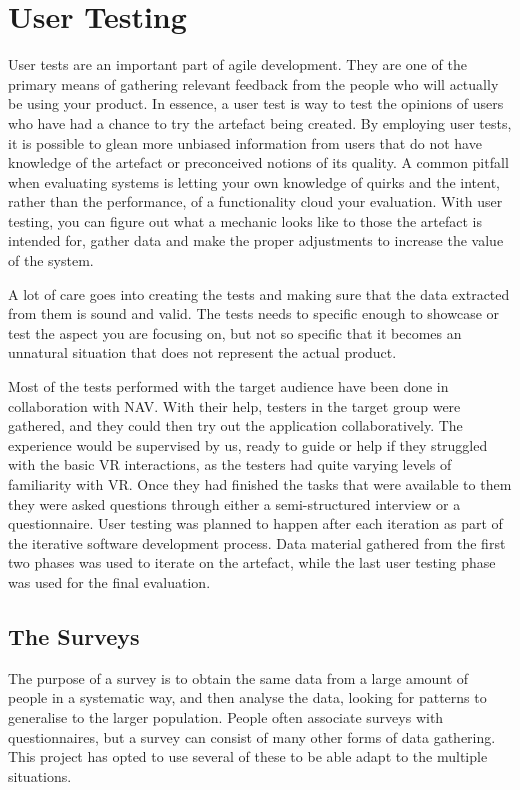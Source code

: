 \section{User Testing}
User tests are an important part of agile development. They are one of the primary means of gathering relevant feedback from the people who will actually be using your product. In essence, a user test is way to test the opinions of users who have had a chance to try the artefact being created. By employing user tests, it is possible to glean more unbiased information from users that do not have knowledge of the artefact or preconceived notions of its quality. A common pitfall when evaluating systems is letting your own knowledge of quirks and the intent, rather than the performance, of a functionality cloud your evaluation. With user testing, you can figure out what a mechanic looks like to those the artefact is intended for, gather data and make the proper adjustments to increase the value of the system.

A lot of care goes into creating the tests and making sure that the data extracted from them is sound and valid. The tests needs to specific enough to showcase or test the aspect you are focusing on, but not so specific that it becomes an unnatural situation that does not represent the actual product.


Most of the tests performed with the target audience have been done in collaboration with NAV. With their help, testers in the target group were gathered, and they could then try out the application collaboratively. The experience would be supervised by us, ready to guide or help if they struggled with the basic VR interactions, as the testers had quite varying levels of familiarity with VR. Once they had finished the tasks that were available to them they were asked questions through either a semi-structured interview or a questionnaire. User testing was planned to happen after each iteration as part of the iterative software development process. Data material gathered from the first two phases was used to iterate on the artefact, while the last user testing phase was used for the final evaluation.




\subsection{The Surveys}
The purpose of a survey is to obtain the same data from a large amount of people in a systematic way, and then analyse the data, looking for patterns to generalise to the larger population\cite{oates2005researching}. People often associate surveys with questionnaires, but a survey can consist of many other forms of data gathering. This project has opted to use several of these to be able adapt to the multiple situations. 

